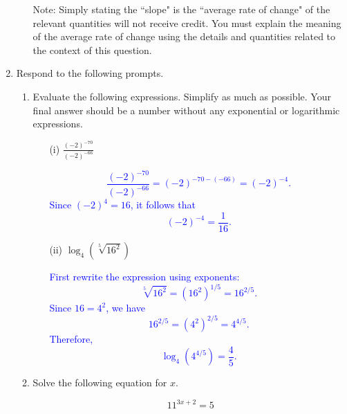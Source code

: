 \documentclass[11pt]{article}
\begin{document}
\begin{enumerate}
\begin{enumerate}
    Note: Simply stating the ``slope" is the ``average rate of change" of the relevant quantities will not receive credit. You must explain the meaning of the average rate of change using the details and quantities related to the context of this question.

    \vfill
    \vfill
\end{enumerate}


\newpage

\item Respond to the following prompts.

\begin{enumerate}

\item Evaluate the following expressions. Simplify as much as possible. Your final answer should be a number without any exponential or logarithmic expressions.

\begin{enumerate}

\item[(i)] $\displaystyle \frac{(-2)^{-70}}{(-2)^{-66}}$

\vfill

\textcolor{blue}{
\[
\frac{(-2)^{-70}}{(-2)^{-66}}
= (-2)^{-70 - (-66)}
= (-2)^{-4}.
\]
Since $(-2)^4 = 16$, it follows that
\[
(-2)^{-4} = \frac{1}{16}.
\]
}

\vfill

\item[(ii)] $\displaystyle \log_{4}\!\left(\sqrt[5]{16^2}\right)$

\vfill

\textcolor{blue}{
First rewrite the expression using exponents:
\[
\sqrt[5]{16^2} = (16^2)^{1/5} = 16^{2/5}.
\]
Since $16 = 4^2$, we have
\[
16^{2/5} = (4^2)^{2/5} = 4^{4/5}.
\]
Therefore,
\[
\log_{4}(4^{4/5}) = \frac{4}{5}.
\]
}

\vfill

\end{enumerate}

\item Solve the following equation for $x$.

\[
11^{3x+2} = 5
\]


\end{enumerate}
\end{enumerate}
\end{document}
